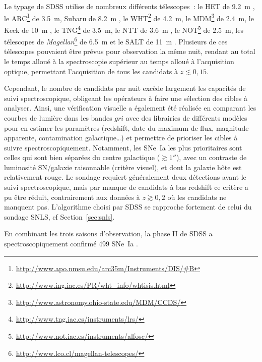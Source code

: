 \documentclass[../main/main.tex]{subfiles}
\begin{document}
Le typage de SDSS utilise de nombreux différents télescopes~: le HET de
\SI{9,2}{m} \citep{hill1998}, le
ARC\footnote{\href{http://www.apo.nmsu.edu/arc35m/Instruments/DIS/\#B}
{http://www.apo.nmsu.edu/arc35m/Instruments/DIS/\#B}} de \SI{3,5}{m}, Subaru de
\SI{8,2}{m} \citep{kashikawa2000}, le
WHT\footnote{\href{http://www.ing.iac.es/PR/wht_info/whtisis.html}
{http://www.ing.iac.es/PR/wht\_info/whtisis.html}} de \SI{4,2}{m}, le
MDM\footnote{\href{http://www.astronomy.ohio-state.edu/MDM/CCDS/}
{http://www.astronomy.ohio-state.edu/MDM/CCDS/}} de \SI{2,4}{m}, le Keck de
\SI{10}{m} \citep{oke1995}, le
TNG\footnote{\href{http://www.tng.iac.es/instruments/lrs/}
{http://www.tng.iac.es/instruments/lrs/}} de \SI{3,5}{m}, le NTT de \SI{3,6}{m}
\citep{dekker1986}, le
NOT\footnote{\href{http://www.not.iac.es/instruments/alfosc/}
{http://www.not.iac.es/instruments/alfosc/}} de \SI{2,5}{m}, les télescopes de
\textit{Magellan}\footnote{\href{http://www.lco.cl/magellan-telescopes/}
{http://www.lco.cl/magellan-telescopes/}} de \SI{6,5}{m} et le SALT de
\SI{11}{m} \citep{burgh2003}. Plusieurs de ces télescopes pouvaient être prévus
pour observation la même nuit, rendant au total le temps alloué à la
spectroscopie supérieur au temps alloué à l'acquisition optique, permettant
l'acquisition de tous les candidats à $z \lesssim 0,15$.

Cependant, le nombre de candidats par nuit excède largement les capacités de
suivi spectroscopique, obligeant les opérateurs à faire une sélection des cibles
à analyser. Ainsi, une vérification visuelle a également été réalisée en
comparant les courbes de lumière dans les bandes $gri$ avec des librairies de
différents modèles pour en estimer les paramètres (redshift, date du maximum de
flux, magnitude apparente, contamination galactique…) et permettre de prioriser
les cibles à suivre spectroscopiquement. Notamment, les SNe~Ia les plus
prioritaires sont celles qui sont bien séparées du centre galactique ($\gtrsim
\ang{;;1}$), avec un contraste de luminosité SN/galaxie raisonnable (critère
visuel), et dont la galaxie hôte est relativement rouge. Le sondage requiert
généralement deux détections avant le suivi spectroscopique, mais par manque de
candidats à bas redshift ce critère a pu être réduit, contrairement aux données
à $z \gtrsim 0,2$ où les candidats ne manquent pas. L'algorithme choisi par SDSS
se rapproche fortement de celui du sondage SNLS, cf Section~\ref{sec:snls}.

En combinant les trois saisons d'observation, la phase II de SDSS a
spectroscopiquement confirmé 499 SNe~Ia \citep{sako2018}.
\end{document}

